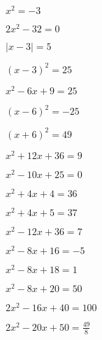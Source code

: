 {\begin{bbwAufgabenBlock}
\item $x^2=-3$
\LoesungsBlock{$\lx=\{ \}$}

\item $2x^2-32 = 0$


\item $|x-3| = 5$


\item $(x-3)^2 = 25 $

\item $x^2-6x+9 = 25$

\item $(x-6)^2 = -25 $
\LoesungsBlock{$\lx = \left\{ \right\}$}

\item $(x+6)^2 = 49$

\item $x^2+12x+36 = 9 $

\item $x^2-10x+25 = 0  $
\LoesungsBlock{$\lx = \left\{ -5 \right\}$}

\item $x^2 + 4x +4 = 36$

\item $x^2+4x+5 = 37$

\item $x^2 -12 x + 36 = 7$

\item $ x^2 - 8x + 16= -5$
\LoesungsBlock{$\lx = \left\{ \right\}$}

\item $ x^2 -8x + 18 = 1$
\LoesungsBlock{$\lx = \left\{ \right\}$}

\item $x^2-8x+20 = 50  $

\item $ 2x^2 -16x + 40 = 100$

\item $ 2x^2 - 20x + 50 = \frac{49}{8} $


\end{bbwAufgabenBlock}}
